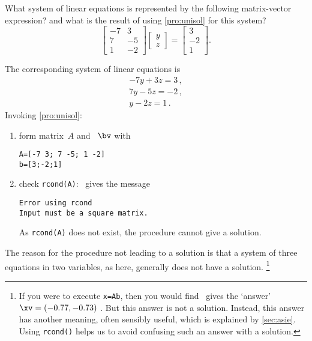 \begin{example} 
What system of linear equations is represented by the following matrix-vector expression?  and what is the result of using \cref{pro:unisol} for this system?
\begin{equation*}
\begin{bmatrix} -7&3\\ 7&-5\\1&-2 \end{bmatrix}
\begin{bmatrix} y\\z \end{bmatrix}
=\begin{bmatrix} 3\\-2\\1 \end{bmatrix}.
\end{equation*}

\begin{solution} 
The corresponding system of linear equations is
\begin{equation*}
\begin{array}{l}
-7y+3z=3\,,\\7y-5z=-2\,,\\y-2z=1\,.
\end{array}
\end{equation*}
Invoking \cref{pro:unisol}:
\begin{enumerate}
\item form matrix~\(A\) and ~\(\bv\) with
\begin{verbatim}
A=[-7 3; 7 -5; 1 -2]
b=[3;-2;1]
\end{verbatim}
\setbox\ajrqrbox\hbox{}%
\marginajrbox%

\item check \verb|rcond(A)|: \script\ gives the message%
%
%
\begin{verbatim}
Error using rcond
Input must be a square matrix. 
\end{verbatim}
As \verb|rcond(A)| does not exist, the procedure cannot give a solution.
\end{enumerate}
The reason for the procedure not leading to a solution is that a system of three equations in two variables, as here, generally does not have a solution.%
\footnote{If you were to execute \texttt{x=A\slosh b}, then you would find \script\ gives the `answer' \(\xv=(-0.77,-0.73)\) \twodp.
But this answer is not a solution.
Instead, this answer has another meaning, often sensibly useful, which is explained by \cref{sec:asie}.
Using \texttt{rcond()} helps us to avoid confusing such an answer with a solution.}
\end{solution}
\end{example}




